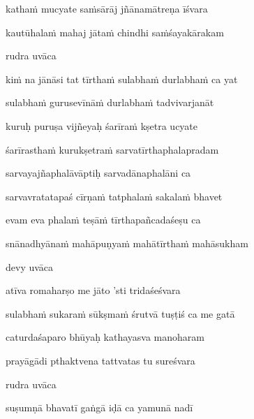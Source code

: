 katha\.m mucyate sa\.msārāj jñānamātreṇa īśvara\thinspace{\dandab} \dontdisplaylinenum

kautūhala\.m mahaj jāta\.m chindhi sa\.mśayakārakam \veg\dontdisplaylinenum

rudra uvāca~{\dandab}\dontdisplaylinenum 

ki\.m na jānāsi tat tīrtha\.m sulabha\.m durlabha\.m ca yat\thinspace{\danda} \dontdisplaylinenum

sulabha\.m gurusevīnā\.m durlabha\.m tadvivarjanāt \veg\dontdisplaylinenum

kuruḥ puruṣa vijñeyaḥ śarīra\.m kṣetra ucyate\thinspace{\dandab} \dontdisplaylinenum

śarīrastha\.m kurukṣetra\.m sarvatīrthaphalapradam \veg\dontdisplaylinenum

sarvayajñaphalāvāptiḥ sarvadānaphalāni ca\thinspace{\dandab} \dontdisplaylinenum

sarvavratatapaś cīrṇa\.m tatphala\.m sakala\.m bhavet \veg\dontdisplaylinenum

evam eva phala\.m teṣā\.m tīrthapañcadaśeṣu ca\thinspace{\dandab} \dontdisplaylinenum

snānadhyāna\.m mahāpuṇya\.m mahātīrtha\.m mahāsukham \veg\dontdisplaylinenum

devy uvāca~{\dandab}\dontdisplaylinenum 

atīva romaharṣo me jāto 'sti tridaśeśvara\thinspace{\danda} \dontdisplaylinenum

sulabha\.m sukara\.m sūkṣma\.m śrutvā tuṣṭiś ca me gatā \veg\dontdisplaylinenum

caturdaśaparo bhūyaḥ kathayasva manoharam\thinspace{\dandab} \dontdisplaylinenum

prayāgādi pthaktvena tattvatas tu sureśvara \veg\dontdisplaylinenum

rudra uvāca~{\dandab}\dontdisplaylinenum 

suṣumṇā bhavatī gaṅgā iḍā ca yamunā nadī\thinspace{\danda} \dontdisplaylinenum

